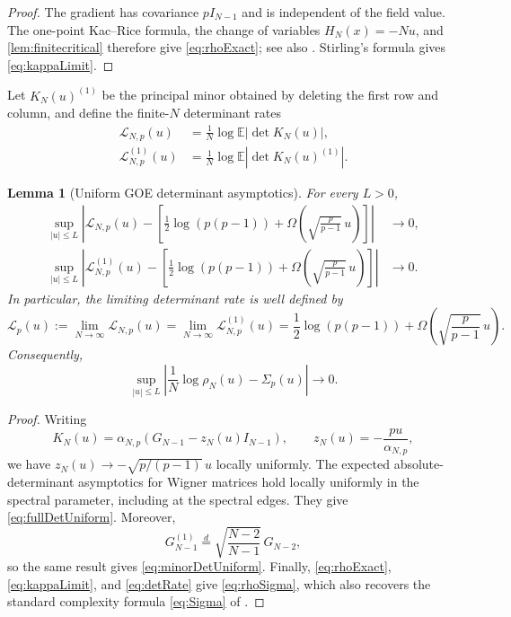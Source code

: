 \documentclass[11pt,reqno]{amsart}
\numberwithin{equation}{section}
\theoremstyle{plain}
\newtheorem{lemma}[lemma]{Lemma}
\theoremstyle{definition}
\theoremstyle{remark}
\newcommand{\E}{\mathbb E}
\newcommand{\1}{\mathbf 1}
\newcommand{\SigmaP}{\Sigma_p}
\newcommand{\Om}{\Omega}
\begin{document}
\begin{proof}
The gradient has covariance \(pI_{N-1}\) and is independent of the
field value.  The one-point Kac--Rice formula, the change of variables
\(H_N(x)=-Nu\), and \cref{lem:finitecritical} therefore give
\eqref{eq:rhoExact}; see also
\cite[Lemma~3.1 and Section~3]{AuffingerBenArousCerny2013}.  Stirling's
formula gives \eqref{eq:kappaLimit}.
\end{proof}

Let \(K_N(u)^{(1)}\) be the principal minor obtained by deleting the
first row and column, and define the finite-\(N\) determinant rates
\begin{align}
 \mathcal L_{N,p}(u)
 &=\frac1N\log\E|\det K_N(u)|,
 \label{eq:finiteFullDetRate}\\
 \mathcal L_{N,p}^{(1)}(u)
 &=\frac1N\log\E|\det K_N(u)^{(1)}|.
 \label{eq:finiteMinorDetRate}
\end{align}

\begin{lemma}[Uniform GOE determinant asymptotics]
\label{lem:uniformGOEdet}
For every \(L>0\),
\begin{align}
 \sup_{|u|\leq L}\left|
 \mathcal L_{N,p}(u)
 -\left[\frac12\log(p(p-1))
 +\Om\left(\sqrt{\frac p{p-1}}\,u\right)\right]
 \right|&\longrightarrow0,\label{eq:fullDetUniform}\\
 \sup_{|u|\leq L}\left|
 \mathcal L_{N,p}^{(1)}(u)
 -\left[\frac12\log(p(p-1))
 +\Om\left(\sqrt{\frac p{p-1}}\,u\right)\right]
 \right|&\longrightarrow0.\label{eq:minorDetUniform}
\end{align}
In particular, the limiting determinant rate is well defined by
\begin{equation}\label{eq:detRate}
 \mathcal L_p(u)
 :=\lim_{N\to\infty}\mathcal L_{N,p}(u)
 =\lim_{N\to\infty}\mathcal L_{N,p}^{(1)}(u)
 =\frac12\log(p(p-1))
 +\Om\left(\sqrt{\frac p{p-1}}\,u\right).
\end{equation}
Consequently,
\begin{equation}\label{eq:rhoSigma}
 \sup_{|u|\leq L}\left|
 \frac1N\log\rho_N(u)-\SigmaP(u)
 \right|\longrightarrow0.
\end{equation}
\end{lemma}

\begin{proof}
Writing
\[
 K_N(u)=\alpha_{N,p}
 \left(G_{N-1}-z_N(u)I_{N-1}\right),
 \qquad z_N(u)=-\frac{pu}{\alpha_{N,p}},
\]
we have \(z_N(u)\to-\sqrt{p/(p-1)}\,u\) locally uniformly.  The
expected absolute-determinant asymptotics for Wigner matrices
\cite[Corollary~1.3]{BenArousBourgadeMcKenna2022} hold locally uniformly
in the spectral parameter, including at the spectral edges.  They give
\eqref{eq:fullDetUniform}.  Moreover,
\begin{equation}\label{eq:minorLaw}
 G_{N-1}^{(1)}\stackrel d=
 \sqrt{\frac{N-2}{N-1}}\,G_{N-2},
\end{equation}
so the same result gives \eqref{eq:minorDetUniform}.  Finally,
\eqref{eq:rhoExact}, \eqref{eq:kappaLimit}, and \eqref{eq:detRate}
give \eqref{eq:rhoSigma}, which also recovers the standard complexity
formula \eqref{eq:Sigma} of \cite{AuffingerBenArousCerny2013}.
\end{proof}
\end{document}
